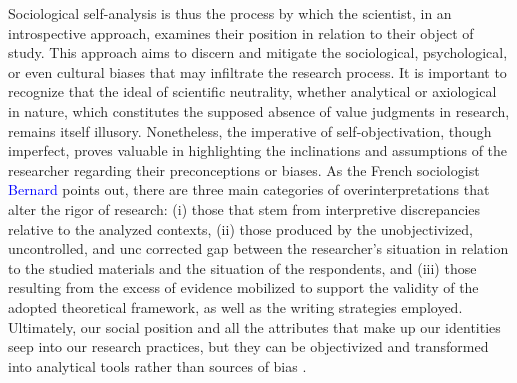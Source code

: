 \begin{refsegment}
Sociological self-analysis is thus the process by which the scientist, in an introspective approach, examines their position in relation to their object of study. This approach aims to discern and mitigate the sociological, psychological, or even cultural biases that may infiltrate the research process. It is important to recognize that the ideal of scientific neutrality, whether analytical or axiological in nature, which constitutes the supposed absence of value judgments in research, remains itself illusory. Nonetheless, the imperative of self-objectivation, though imperfect, proves valuable in highlighting the inclinations and assumptions of the researcher regarding their preconceptions or biases. As the French sociologist \textcolor{blue}{Bernard} \textcolor{blue}{\textcite[4]{lahire_risquer_1996}} points out, there are three main categories of overinterpretations that alter the rigor of research: (i) those that stem from interpretive discrepancies relative to the analyzed contexts, (ii) those produced by the unobjectivized, uncontrolled, and unc corrected gap between the researcher’s situation in relation to the studied materials and the situation of the respondents, and (iii) those resulting from the excess of evidence mobilized to support the validity of the adopted theoretical framework, as well as the writing strategies employed. Ultimately, our social position and all the attributes that make up our identities seep into our research practices, but they can be objectivized and transformed into analytical tools rather than sources of bias \textcolor{blue}{\autocite[7]{scarfo_ghellab_lauto-socio-analyse_2015}}.%


\end{refsegment}
